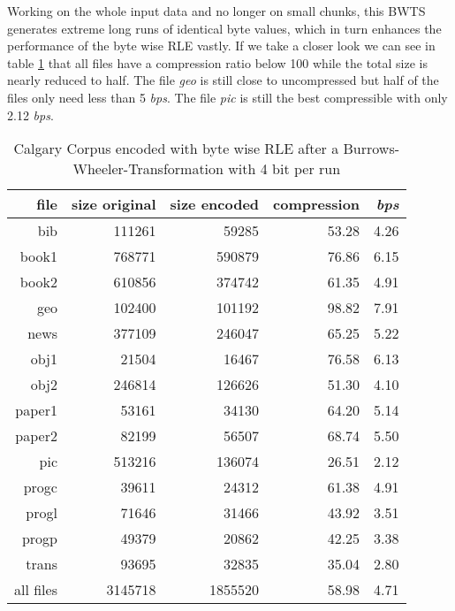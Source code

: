 \par{
Working on the whole input data and no longer on small chunks, this BWTS generates extreme long runs of identical byte values, which in turn enhances the performance of the byte wise RLE vastly. If we take a closer look we can see in table \ref{tab:t14:Calgary Corpus encoded with byte wise RLE after a Burrows-Wheeler-Transformation} that all files have a compression ratio below 100 while the total size is nearly reduced to half. The file \textit{geo} is still close to uncompressed but half of the files only need less than 5 \textit{bps}. The file \textit{pic} is still the best compressible with only 2.12 \textit{bps}.
\begin{table}[H]
	\centering
	\begin{tabular}{r|r|r|r|r}	
		file & size original & size encoded & compression & \textit{bps}\\
		\hline
bib & 111261 & 59285 & 53.28 & 4.26 \\
book1 & 768771 & 590879 & 76.86 & 6.15 \\
book2 & 610856 & 374742 & 61.35 & 4.91 \\
geo & 102400 & 101192 & 98.82 & 7.91 \\
news & 377109 & 246047 & 65.25 & 5.22 \\
obj1 & 21504 & 16467 & 76.58 & 6.13 \\
obj2 & 246814 & 126626 & 51.30 & 4.10 \\
paper1 & 53161 & 34130 & 64.20 & 5.14 \\
paper2 & 82199 & 56507 & 68.74 & 5.50 \\
pic & 513216 & 136074 & 26.51 & 2.12 \\
progc & 39611 & 24312 & 61.38 & 4.91 \\
progl & 71646 & 31466 & 43.92 & 3.51 \\
progp & 49379 & 20862 & 42.25 & 3.38 \\
trans & 93695 & 32835 & 35.04 & 2.80 \\
\hline
all files & 3145718 & 1855520 & 58.98 & 4.71
	\end{tabular}
	\caption{Calgary Corpus encoded with byte wise RLE after a Burrows-Wheeler-Transformation with 4 bit per run}
	\label{tab:t14:Calgary Corpus encoded with byte wise RLE after a Burrows-Wheeler-Transformation}
\end{table}
}
